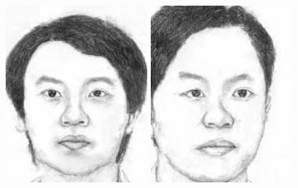 \documentclass[10pt,twocolumn,letterpaper]{article}
\begin{document}
\begin{figure}[htbp]
{\begin{minipage}[b]{0.22\linewidth}
\includegraphics[width=0.99\linewidth]{img/light&pose_invariance/mrfe_l2.jpg}
\includegraphics[width=0.99\linewidth]{img/light&pose_invariance/mrfe_p1.jpg}

\end{minipage}}
\end{figure}
\end{document}
